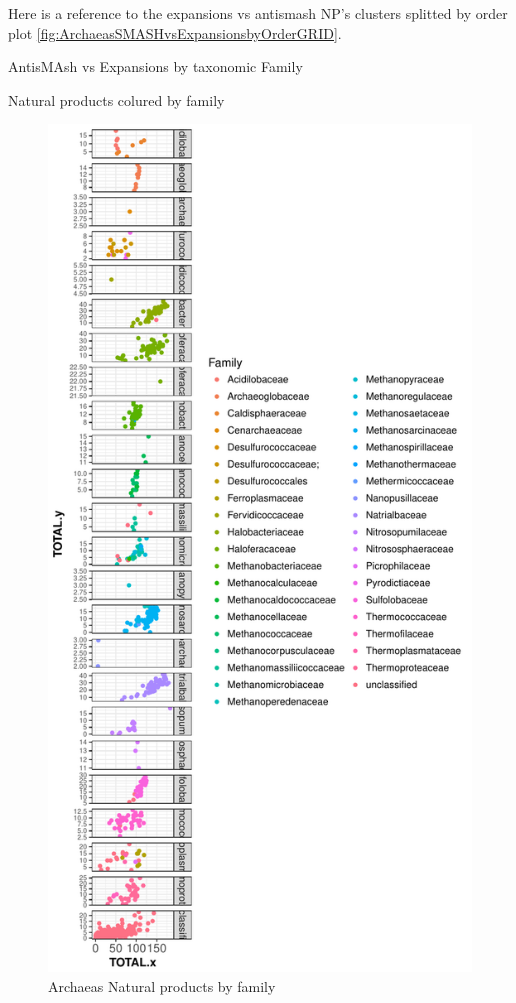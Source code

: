 \documentclass[12pt,twoside]{reedthesis}
\begin{document}
  Here is a reference to the expansions vs antismash NP's clusters
  splitted by order plot
  \autoref{fig:ArchaeasSMASHvsExpansionsbyOrderGRID}. \clearpage 
  
  AntisMAsh vs Expansions by taxonomic Family
  
  Natural products colured by family
  
  \begin{figure}[h!tbp]
  \centering
  \includegraphics[angle = 0,scale = 0.6]{chapter3/Archaeasnpf.pdf}
  \caption[Archaeas Natural products by family]{\normalsize{Archaeas Natural products by family}}
  \label{fig:Archaeasnpf}
  \end{figure}
  
\end{document}
